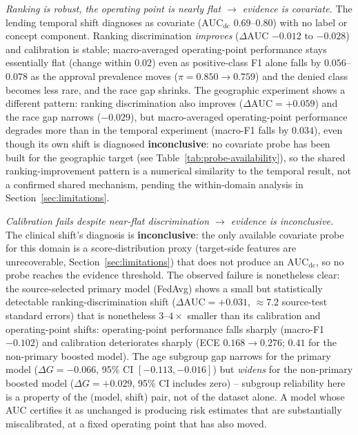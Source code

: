 \documentclass[11pt]{article}
\begin{document}
\emph{Ranking is robust, the operating point is nearly flat $\rightarrow$ evidence is covariate.}
The lending temporal shift diagnoses as covariate ($\text{AUC}_{\text{dc}}$ $0.69$--$0.80$) with no
label or concept component. Ranking discrimination \emph{improves} ($\Delta\text{AUC}$ $-0.012$ to
$-0.028$) and calibration is stable; macro-averaged operating-point performance stays essentially
flat (change within $0.02$) even as positive-class F1 alone falls by $0.056$--$0.078$ as the
approval prevalence moves ($\pi=0.850\rightarrow 0.759$) and the denied class becomes less rare, and
the race gap shrinks. The geographic experiment shows a different pattern: ranking discrimination
also improves ($\Delta\text{AUC}=+0.059$) and the race gap narrows ($-0.029$), but macro-averaged
operating-point performance degrades more than in the temporal experiment (macro-F1 falls by
$0.034$), even though its own shift is diagnosed \textbf{inconclusive}: no covariate probe has been
built for the geographic target (see Table~\ref{tab:probe-availability}), so the shared
ranking-improvement pattern is a numerical similarity to the temporal result, not a confirmed shared
mechanism, pending the within-domain analysis in Section~\ref{sec:limitations}.

\emph{Calibration fails despite near-flat discrimination $\rightarrow$ evidence is inconclusive.}
The clinical shift's diagnosis is \textbf{inconclusive}: the only available covariate probe for
this domain is a score-distribution
proxy (target-side features are unrecoverable, Section~\ref{sec:limitations}) that does not
produce an $\text{AUC}_{\text{dc}}$, so no probe reaches the evidence threshold. The observed
failure is nonetheless clear: the source-selected primary model (FedAvg) shows a small but
statistically detectable ranking-discrimination shift ($\Delta\text{AUC}=+0.031$, $\approx 7.2$
source-test standard errors) that is nonetheless $3$--$4\times$ smaller than its calibration and
operating-point shifts: operating-point performance falls sharply (macro-F1 $-0.102$) and
calibration deteriorates sharply (ECE $0.168\rightarrow 0.276$; $0.41$ for the non-primary boosted
model). The age subgroup gap narrows for the primary model
($\Delta G=-0.066$, 95\% CI $[-0.113,-0.016]$) but \emph{widens} for the non-primary boosted model
($\Delta G=+0.029$, 95\% CI includes zero) -- subgroup reliability here is a property of the
(model, shift) pair, not of the dataset alone. A model whose AUC certifies it as unchanged is
producing risk estimates that are substantially miscalibrated, at a fixed operating point that has
also moved.
\end{document}
